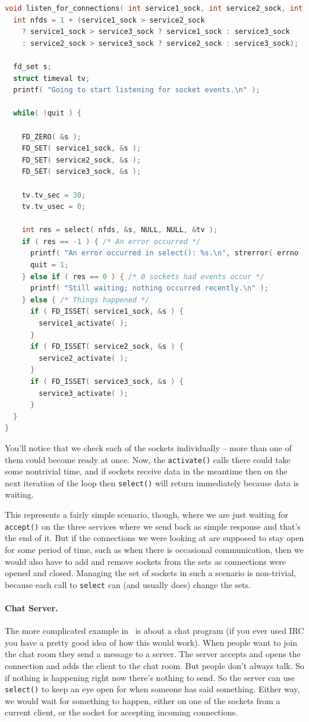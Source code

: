 \documentclass[a4paper]{report}
\begin{document}
\begin{lstlisting}[language=C]
void listen_for_connections( int service1_sock, int service2_sock, int service3_sock ) {
  int nfds = 1 + (service1_sock > service2_sock
    ? service1_sock > service3_sock ? service1_sock : service3_sock
    : service2_sock > service3_sock ? service2_sock : service3_sock);
    
  fd_set s;
  struct timeval tv;
  printf( "Going to start listening for socket events.\n" );
  
  while( !quit ) {
  
    FD_ZERO( &s );
    FD_SET( service1_sock, &s );
    FD_SET( service2_sock, &s );
    FD_SET( service3_sock, &s );
    
    tv.tv_sec = 30;
    tv.tv_usec = 0;
  
    int res = select( nfds, &s, NULL, NULL, &tv );
    if ( res == -1 ) { /* An error occurred */
      printf( "An error occurred in select(): %s.\n", strerror( errno ) );
      quit = 1;
    } else if ( res == 0 ) { /* 0 sockets had events occur */
      printf( "Still waiting; nothing occurred recently.\n" );
    } else { /* Things happened */
      if ( FD_ISSET( service1_sock, &s ) {
        service1_activate( ); 
      }
      if ( FD_ISSET( service2_sock, &s ) {
        service2_activate( ); 
      }
      if ( FD_ISSET( service3_sock, &s ) {
        service3_activate( ); 
      }
  }
}
\end{lstlisting}

You'll notice that we check each of the sockets individually -- more than one of them could become ready at once. Now, the \texttt{activate()} calls there could take some nontrivial time, and if sockets receive data in the meantime then on the next iteration of the loop then \texttt{select()} will return immediately because data is waiting.

This represents a fairly simple scenario, though, where we are just waiting for \texttt{accept()} on the three services where we send back as simple response and that's the end of it. But if the connections we were looking at are supposed to stay open for some period of time, such as when there is occasional communication, then we would also have to add and remove sockets from the sets as connections were opened and closed. Managing the set of sockets in such a scenario is non-trivial, because each call to \texttt{select} can (and usually does) change the sets.

\paragraph{Chat Server.} The more complicated example in~\cite{getaddrinfo} is about a chat program (if you ever used IRC you have a pretty good idea of how this would work). When people want to join the chat room they send a message to a server. The server accepts and opens the connection and adds the client to the chat room. But people don't always talk. So if nothing is happening right now there's nothing to send. So the server can use \texttt{select()} to keep an eye open for when someone has said something. Either way, we would wait for something to happen, either on one of the sockets from a current client, or the socket for accepting incoming connections.
\end{document}
